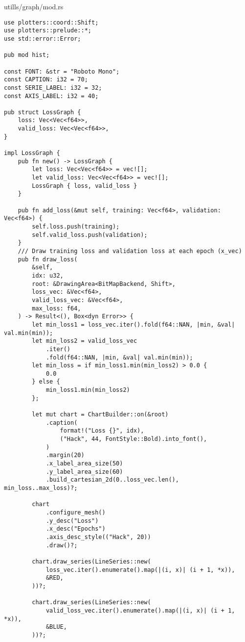 \begin{code}
\caption{utills/graph/mod.rs}
\begin{verbatim}  
use plotters::coord::Shift;
use plotters::prelude::*;
use std::error::Error;

pub mod hist;

const FONT: &str = "Roboto Mono";
const CAPTION: i32 = 70;
const SERIE_LABEL: i32 = 32;
const AXIS_LABEL: i32 = 40;

pub struct LossGraph {
    loss: Vec<Vec<f64>>,
    valid_loss: Vec<Vec<f64>>,
}

impl LossGraph {
    pub fn new() -> LossGraph {
        let loss: Vec<Vec<f64>> = vec![];
        let valid_loss: Vec<Vec<f64>> = vec![];
        LossGraph { loss, valid_loss }
    }

    pub fn add_loss(&mut self, training: Vec<f64>, validation: Vec<f64>) {
        self.loss.push(training);
        self.valid_loss.push(validation);
    }
    /// Draw training loss and validation loss at each epoch (x_vec)
    pub fn draw_loss(
        &self,
        idx: u32,
        root: &DrawingArea<BitMapBackend, Shift>,
        loss_vec: &Vec<f64>,
        valid_loss_vec: &Vec<f64>,
        max_loss: f64,
    ) -> Result<(), Box<dyn Error>> {
        let min_loss1 = loss_vec.iter().fold(f64::NAN, |min, &val| val.min(min));
        let min_loss2 = valid_loss_vec
            .iter()
            .fold(f64::NAN, |min, &val| val.min(min));
        let min_loss = if min_loss1.min(min_loss2) > 0.0 {
            0.0
        } else {
            min_loss1.min(min_loss2)
        };

        let mut chart = ChartBuilder::on(&root)
            .caption(
                format!("Loss {}", idx),
                ("Hack", 44, FontStyle::Bold).into_font(),
            )
            .margin(20)
            .x_label_area_size(50)
            .y_label_area_size(60)
            .build_cartesian_2d(0..loss_vec.len(), min_loss..max_loss)?;

        chart
            .configure_mesh()
            .y_desc("Loss")
            .x_desc("Epochs")
            .axis_desc_style(("Hack", 20))
            .draw()?;

        chart.draw_series(LineSeries::new(
            loss_vec.iter().enumerate().map(|(i, x)| (i + 1, *x)),
            &RED,
        ))?;

        chart.draw_series(LineSeries::new(
            valid_loss_vec.iter().enumerate().map(|(i, x)| (i + 1, *x)),
            &BLUE,
        ))?;


\end{verbatim}
\end{code}
